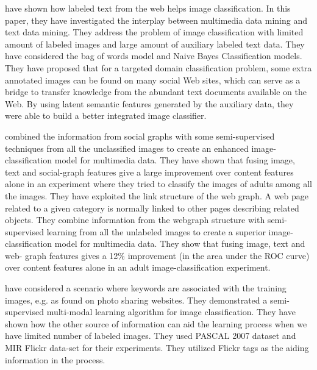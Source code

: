 \citet*{heterogeneous} have shown  how labeled text from the web
helps image classification. In this paper, they have investigated
the interplay between multimedia data mining and text data mining.
They address the problem of image classification with limited amount
of labeled images and large amount of auxiliary labeled text data.
They have considered the bag of words model and Naive Bayes
Classification models. They have proposed that for a targeted domain
classification problem, some  extra annotated images can be found on
many social Web sites, which can serve as a bridge to transfer
knowledge from the abundant text documents available on the Web.
By using latent semantic features generated by the auxiliary data,
they were able to build a better integrated image classifier.

\citet*{dhruv} combined the information  from social graphs with some
semi-supervised techniques from all the unclassified images to
create an enhanced image-classification model for multimedia data.
They have shown that fusing image, text and social-graph features
give a large improvement over content features alone in an
experiment where they tried to classify the
images of adults among all the images. They have exploited the link
structure of the web graph. A web page related to a given category
is normally linked to other pages describing related objects. They
combine information from the webgraph structure with semi-supervised learning from all the unlabeled images to create a superior image-classification
model for multimedia data. They show that fusing image, text and web-
graph features gives a 12$\%$ improvement (in the area under the ROC
curve) over content features alone in an adult image-classification
experiment.

\citet*{mmodel} have considered a scenario where keywords are
associated with the training images, e.g. as found on photo sharing
websites. They demonstrated a semi-supervised multi-modal learning
algorithm for image classification. They have shown how the other
source of information can aid the learning process when we have
limited number of labeled images. They used PASCAL 2007 dataset and
MIR Flickr data-set for their experiments. They utilized Flickr
tags as the aiding information in the process.

